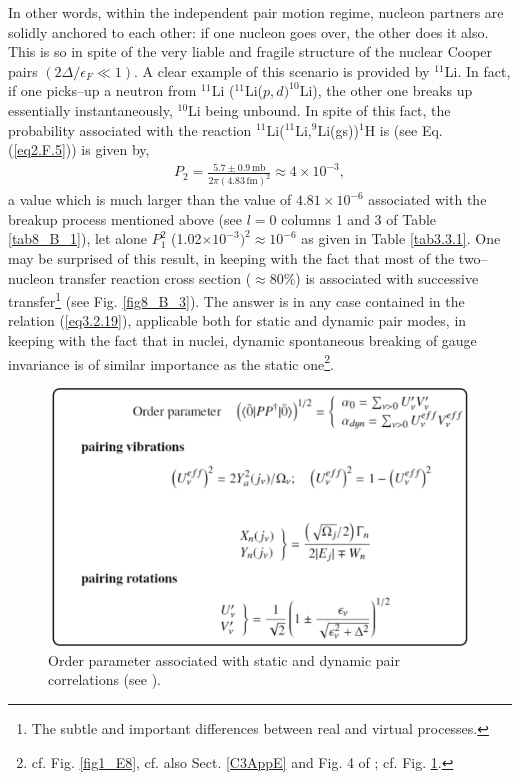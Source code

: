 In other words, within the independent pair motion regime, nucleon partners are solidly anchored to each other: if one nucleon goes over, the other does it also. This is so in spite of the very liable and fragile structure of the nuclear Cooper pairs $(2\Delta/\epsilon_F\ll1)$. A clear example of this scenario is  provided by $^{11}$Li. In fact, if one picks--up a neutron from $^{11}$Li ($^{11}$Li($p,d)^{10}$Li), the other one breaks up essentially instantaneously, $^{10}$Li being unbound. In spite of this fact, the probability associated with the reaction $^{11}$Li($^{11}$Li,$^9$Li(gs))$^{1}$H is (see  Eq. (\ref{eq2.F.5}))  is given by,
\begin{align}
P_2=\frac{5.7\pm0.9\,\text{mb}}{2\pi(4.83\,\text{fm})^2}\approx 4\times10^{-3},
\end{align}
a value which is much larger than the value of $4.81\times10^{-6}$ associated with the breakup process mentioned above (see $l=0$ columns 1 and 3 of Table \ref{tab8_B_1}), let alone $P_1^2$ (1.02$\times 10^{-3})^2\approx 10^{-6}$ as given in Table \ref{tab3.3.1}. One may be surprised of this result, in keeping with the fact that most of the two--nucleon transfer reaction cross section ($\approx 80$\%) is associated with successive transfer\footnote{The subtle and important differences between real and virtual processes.} (see Fig. \ref{fig8_B_3}). The answer is in any case contained in the relation (\ref{eq3.2.19}), applicable both for static and dynamic pair modes, in keeping with the fact that in nuclei, dynamic spontaneous breaking of gauge invariance is of similar importance as the static one\footnote{cf. Fig. \ref{fig1_E8}, cf. also Sect. \ref{C3AppE} and Fig. 4 of \cite{Potel:13b}; cf. Fig. \ref{fig3.3.2}.}. 
\begin{figure}
\centerline{\includegraphics*[width=15cm,angle=0]{nutshell/figs/fig3_3_2.pdf}}
\caption{Order parameter associated with static and dynamic pair correlations (see \cite{Potel:13b}).}\label{fig3.3.2}
\end{figure}
